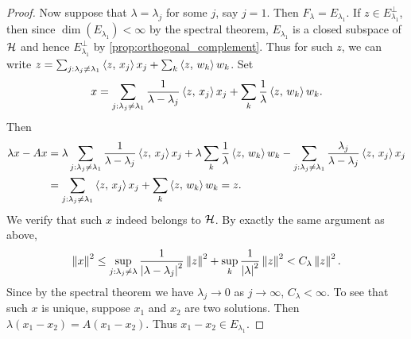 \begin{proof}
    Now suppose that $\lambda = \lambda_{j}$ for some $j$, say $j=1$. Then $F_\lambda = E_{\lambda_1}$. 
    If $z\in E_{\lambda_1}^\perp$, then since $\dim(E_{\lambda_1})<\infty$ by the spectral theorem, 
    $E_{\lambda_1}$ is a closed subspace of $\mathcal{H}$ and hence $E_{\lambda_1}^\perp$ by 
    \cref{prop:orthogonal_complement}. Thus for such $z$, we can write $z = 
    \sum_{j:\lambda_j\neq\lambda_1} \left\langle {z},\, {x_j} \right\rangle x_j + \sum_k\left\langle {z},\, {w_k} \right\rangle w_k$. 
    Set 
    \begin{equation*}
        x = \sum_{j:\lambda_j\neq\lambda_1}\frac{1}{\lambda-\lambda_j}\left\langle {z},\, {x_j} \right\rangle x_j + \sum_k\frac{1}{\lambda}\left\langle {z},\, {w_k} \right\rangle w_k.
    \end{equation*}
    Then 
    \begin{equation*}
        \begin{split}
            \lambda x - Ax 
            &= \lambda\sum_{j:\lambda_j\neq\lambda_1}\frac{1}{\lambda-\lambda_j}\left\langle {z},\, {x_j} \right\rangle x_j + \lambda\sum_k\frac{1}{\lambda}\left\langle {z},\, {w_k} \right\rangle w_k - \sum_{j:\lambda_j\neq\lambda_1}\frac{\lambda_j}{\lambda-\lambda_j}\left\langle {z},\, {x_j} \right\rangle x_j \\
            &= \sum_{j:\lambda_j\neq\lambda_1}\left\langle {z},\, {x_j} \right\rangle x_j + \sum_k\left\langle {z},\, {w_k} \right\rangle w_k = z.
        \end{split}
    \end{equation*}
    We verify that such $x$ indeed belongs to $\mathcal{H}$. By exactly the same argument as above, 
    \begin{equation*}
        \left\lVert {x} \right\rVert^2 \leq \sup_{j:\lambda_j\neq\lambda}\frac{1}{\left\lvert {\lambda-\lambda_j} \right\rvert^2}\left\lVert {z} \right\rVert^2 + \sup_k\frac{1}{\left\lvert {\lambda} \right\rvert^2}\left\lVert {z} \right\rVert^2 < C_\lambda\left\lVert {z} \right\rVert^2.
    \end{equation*}
    Since by the spectral theorem we have $\lambda_j\to 0$ as $j\to\infty$, $C_\lambda<\infty$.
    To see that such $x$ is unique, suppose $x_1$ and $x_2$ are two solutions. Then 
    $\lambda(x_1-x_2) = A(x_1-x_2)$. Thus $x_1-x_2\in E_{\lambda_1}$.

\end{proof}